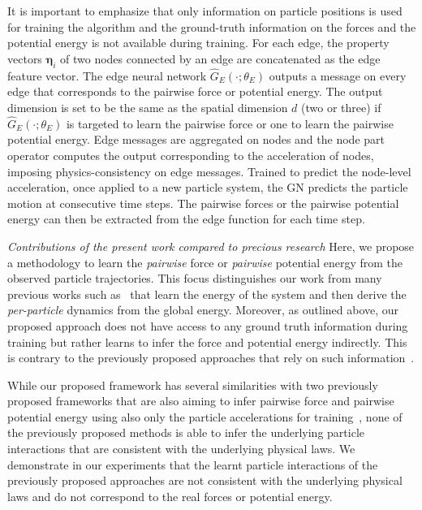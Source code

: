 \documentclass{article}
\begin{document}
It is important to emphasize that only information on particle positions is used for training the algorithm and the ground-truth information on the forces and the potential energy is not available during training.  For each edge, the property vectors $\bm{\eta}_i$ of two nodes connected by an edge are concatenated as the edge feature vector. The edge neural network $\hat{G}_E(\cdot; \theta_{E})$ outputs a message on every edge that corresponds to the pairwise force or potential energy. The output dimension is set to be the same as the spatial dimension $d$ (two or three) if $\hat{G}_E(\cdot; \theta_{E})$ is targeted to learn the pairwise force or one to learn the pairwise potential energy. Edge messages are aggregated on nodes and the node part operator computes the output corresponding to the acceleration of nodes, imposing physics-consistency on edge messages. Trained to predict the node-level acceleration, once applied to a new particle system, the GN predicts the particle motion at consecutive time steps. The pairwise forces or the pairwise potential energy can then be extracted from the edge function for each time step.

\emph{Contributions of the present work compared to precious research} Here, we propose a methodology to learn the \emph{pairwise} force or \emph{pairwise} potential energy from the observed particle trajectories. This focus distinguishes our work from many previous works such as~\cite{greydanus2019hamiltonian, sanchez2019hamiltonian, lutter2019deep, schutt2017schnet, wang2019machine, finzi2020simplifying} that learn the energy of the system and then derive the \emph{per-particle} dynamics from the global energy. Moreover, as outlined above, our proposed approach does not have access to any ground truth information during training but rather learns to infer the force and potential energy indirectly. This is contrary to the previously proposed approaches that rely on such information~\cite{unke2019physnet, hu2021forcenet}. 

While our proposed framework has several similarities with two previously proposed frameworks that are also aiming to infer pairwise force and pairwise potential energy using also only the particle accelerations for training~\cite{cranmer2020discovering, cranmer2020discovering}, none of the previously proposed methods is able to infer the underlying particle interactions that are consistent with the underlying physical laws. We demonstrate in our experiments that the learnt particle interactions of the previously proposed approaches are not consistent with the underlying physical laws and do not correspond to the real forces or potential energy. 
\end{document}
